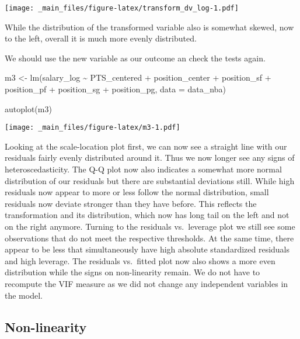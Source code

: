\documentclass[
]{book}
\newenvironment{Shaded}{\begin{snugshade}}{\end{snugshade}}
\newcommand{\AttributeTok}[1]{\textcolor[rgb]{0.77,0.63,0.00}{#1}}
\newcommand{\FunctionTok}[1]{\textcolor[rgb]{0.00,0.00,0.00}{#1}}
\newcommand{\NormalTok}[1]{#1}
\newcommand{\OtherTok}[1]{\textcolor[rgb]{0.56,0.35,0.01}{#1}}
\newcommand{\SpecialCharTok}[1]{\textcolor[rgb]{0.00,0.00,0.00}{#1}}
\begin{document}
\texttt{[image: \_main\_files/figure-latex/transform\_dv\_log-1.pdf]}

While the distribution of the transformed variable also is somewhat skewed, now
to the left, overall it is much more evenly distributed.

We should use the new variable as our outcome an check the tests again.

\begin{Shaded}
\begin{Highlighting}[]
\NormalTok{m3 }\OtherTok{\textless{}{-}} \FunctionTok{lm}\NormalTok{(salary\_log }\SpecialCharTok{\textasciitilde{}}\NormalTok{ PTS\_centered }\SpecialCharTok{+}\NormalTok{ position\_center }\SpecialCharTok{+}\NormalTok{ position\_sf }\SpecialCharTok{+}\NormalTok{  position\_pf }\SpecialCharTok{+}\NormalTok{ position\_sg }\SpecialCharTok{+}\NormalTok{ position\_pg, }\AttributeTok{data =}\NormalTok{ data\_nba)}

\FunctionTok{autoplot}\NormalTok{(m3)}
\end{Highlighting}
\end{Shaded}

\texttt{[image: \_main\_files/figure-latex/m3-1.pdf]}

Looking at the scale-location plot first, we can now see a straight line with
our residuals fairly evenly distributed around it. Thus we now longer see any
signs of heteroscedasticity. The Q-Q plot now also indicates a somewhat more
normal distribution of our residuals but there are substantial deviations still.
While high residuals now appear to more or less follow the normal distribution,
small residuals now deviate stronger than they have before. This reflects the
transformation and its distribution, which now has long tail on the left and not
on the right anymore. Turning to the residuals vs.~leverage plot we still see
some observations that do not meet the respective thresholds. At the same time,
there appear to be less that simultaneously have high absolute standardized
residuals and high leverage. The residuals vs.~fitted plot now also shows a more
even distribution while the signs on non-linearity remain. We do not have to
recompute the VIF measure as we did not change any independent variables in the
model.

\hypertarget{non-linearity}{%
\subsection{Non-linearity}\label{non-linearity}}
\end{document}
